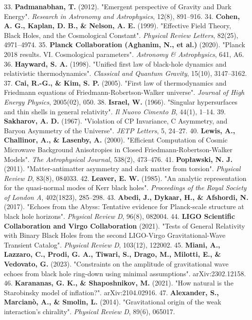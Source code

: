 \documentclass[11pt,a4paper]{article}
\theoremstyle{definition}
\theoremstyle{remark}
\begin{document}
33. \textbf{Padmanabhan, T.} (2012). "Emergent perspective of Gravity and Dark Energy". \textit{Research in Astronomy and Astrophysics}, 12(8), 891–916.
34. \textbf{Cohen, A. G., Kaplan, D. B., \& Nelson, A. E.} (1999). "Effective Field Theory, Black Holes, and the Cosmological Constant". \textit{Physical Review Letters}, 82(25), 4971–4974.
35. \textbf{Planck Collaboration (Aghanim, N., et al.)} (2020). "Planck 2018 results. VI. Cosmological parameters". \textit{Astronomy \& Astrophysics}, 641, A6.
36. \textbf{Hayward, S. A.} (1998). "Unified first law of black-hole dynamics and relativistic thermodynamics". \textit{Classical and Quantum Gravity}, 15(10), 3147–3162.
37. \textbf{Cai, R.-G., \& Kim, S. P.} (2005). "First law of thermodynamics and Friedmann equations of Friedmann-Robertson-Walker universe". \textit{Journal of High Energy Physics}, 2005(02), 050.
38. \textbf{Israel, W.} (1966). "Singular hypersurfaces and thin shells in general relativity". \textit{Il Nuovo Cimento B}, 44(1), 1–14.
39. \textbf{Sakharov, A. D.} (1967). "Violation of CP Invariance, C Asymmetry, and Baryon Asymmetry of the Universe". \textit{JETP Letters}, 5, 24–27.
40. \textbf{Lewis, A., Challinor, A., \& Lasenby, A.} (2000). "Efficient Computation of Cosmic Microwave Background Anisotropies in Closed Friedmann-Robertson-Walker Models". \textit{The Astrophysical Journal}, 538(2), 473–476.
41. \textbf{Popławski, N. J.} (2011). "Matter-antimatter asymmetry and dark matter from torsion". \textit{Physical Review D}, 83(8), 084033.
42. \textbf{Leaver, E. W.} (1985). "An analytic representation for the quasi-normal modes of Kerr black holes". \textit{Proceedings of the Royal Society of London A}, 402(1823), 285–298.
43. \textbf{Abedi, J., Dykaar, H., \& Afshordi, N.} (2017). "Echoes from the Abyss: Tentative evidence for Planck-scale structure at black hole horizons". \textit{Physical Review D}, 96(8), 082004.
44. \textbf{LIGO Scientific Collaboration and Virgo Collaboration} (2021). "Tests of General Relativity with Binary Black Holes from the second LIGO-Virgo Gravitational-Wave Transient Catalog". \textit{Physical Review D}, 103(12), 122002.
45. \textbf{Miani, A., Lazzaro, C., Prodi, G. A., Tiwari, S., Drago, M., Milotti, E., \& Vedovato, G.} (2023). "Constraints on the amplitude of gravitational wave echoes from black hole ring-down using minimal assumptions". arXiv:2302.12158.
46. \textbf{Karananas, G. K., \& Shaposhnikov, M.} (2021). "How natural is the Starobinsky model of inflation?". arXiv:2104.02916.
47. \textbf{Alexander, S., Marcianò, A., \& Smolin, L.} (2014). "Gravitational origin of the weak interaction's chirality". \textit{Physical Review D}, 89(6), 065017.
\end{document}
